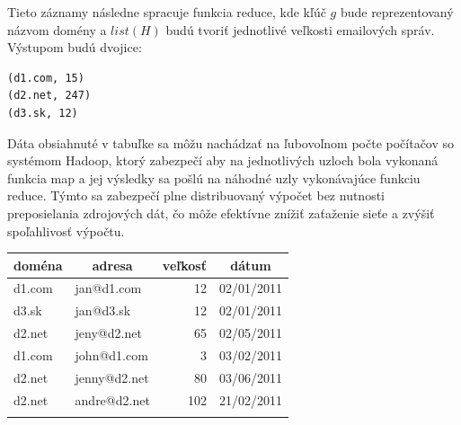 \documentclass[11pt,twoside,a4paper]{book}
\begin{document}
Tieto záznamy následne spracuje funkcia reduce, kde kľúč $g$ bude reprezentovaný názvom domény a $list(H)$ budú tvoriť jednotlivé veľkosti emailových správ. Výstupom budú dvojice:

\begin{verbatim}
(d1.com, 15)
(d2.net, 247)
(d3.sk, 12)
\end{verbatim}

Dáta obsiahnuté v tabuľke sa môžu nachádzať na ľubovoľnom počte počítačov so systémom Hadoop, ktorý zabezpečí aby na jednotlivých uzloch bola vykonaná funkcia map a jej výsledky sa pošlú na náhodné uzly vykonávajúce funkciu reduce. Týmto sa zabezpečí plne distribuovaný výpočet bez nutnosti preposielania zdrojových dát, čo môže efektívne znížiť zaťaženie sieťe a zvýšiť spoľahlivosť výpočtu.


{\centering%
\label{tab:001}\par\bigskip
\begin{tabular}{llrl}\toprule
  \multicolumn{1}{c}{doména} & \multicolumn{1}{c}{adresa} & \multicolumn{1}{c}{veľkosť} &\multicolumn{1}{c}{dátum}\\\midrule\addlinespace
    d1.com & jan@d1.com & 12 & 02/01/2011\\\addlinespace    
    d3.sk  & jan@d3.sk & 12 & 02/01/2011\\\addlinespace
    d2.net & jeny@d2.net & 65 & 02/05/2011\\\addlinespace
    d1.com & john@d1.com & 3 & 03/02/2011\\\addlinespace
    d2.net & jenny@d2.net & 80 & 03/06/2011\\\addlinespace
    d2.net & andre@d2.net & 102 & 21/02/2011\\\addlinespace
 \hline
\end{tabular}\\}
\label{tab:mapred}
\par\bigskip



% 

% 
\end{document}
